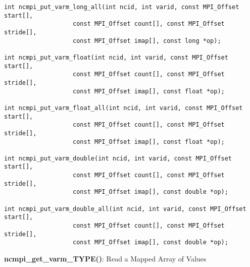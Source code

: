 \begin{verbatim}
int ncmpi_put_varm_long_all(int ncid, int varid, const MPI_Offset start[],
                   const MPI_Offset count[], const MPI_Offset stride[],
                   const MPI_Offset imap[], const long *op);

int ncmpi_put_varm_float(int ncid, int varid, const MPI_Offset start[],
                   const MPI_Offset count[], const MPI_Offset stride[],
                   const MPI_Offset imap[], const float *op);

int ncmpi_put_varm_float_all(int ncid, int varid, const MPI_Offset start[],
                   const MPI_Offset count[], const MPI_Offset stride[],
                   const MPI_Offset imap[], const float *op);

int ncmpi_put_varm_double(int ncid, int varid, const MPI_Offset start[],
                   const MPI_Offset count[], const MPI_Offset stride[],
                   const MPI_Offset imap[], const double *op);

int ncmpi_put_varm_double_all(int ncid, int varid, const MPI_Offset start[],
                   const MPI_Offset count[], const MPI_Offset stride[],
                   const MPI_Offset imap[], const double *op);
\end{verbatim}


{\bf ncmpi\_get\_varm\_TYPE()}: Read a Mapped Array of Values

